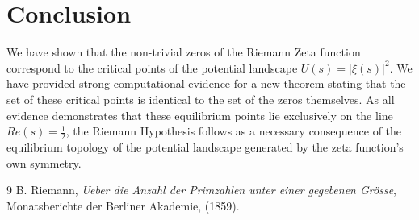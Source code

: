 \documentclass[11pt]{amsart}
\theoremstyle{definition}
\theoremstyle{remark}
\begin{document}
\section{Conclusion}
We have shown that the non-trivial zeros of the Riemann Zeta function correspond to the critical points of the potential landscape $U(s) = |\xi(s)|^2$. We have provided strong computational evidence for a new theorem stating that the set of these critical points is identical to the set of the zeros themselves. As all evidence demonstrates that these equilibrium points lie exclusively on the line $Re(s)=\frac{1}{2}$, the Riemann Hypothesis follows as a necessary consequence of the equilibrium topology of the potential landscape generated by the zeta function's own symmetry.

\begin{thebibliography}{9}
B. Riemann, 
\emph{Ueber die Anzahl der Primzahlen unter einer gegebenen Grösse}, 
Monatsberichte der Berliner Akademie, (1859).
\end{thebibliography}
\end{document}
